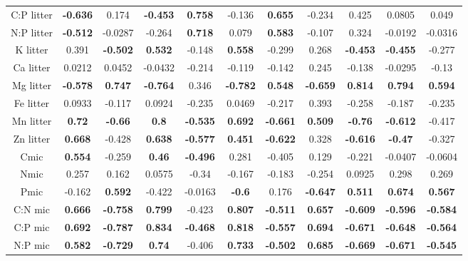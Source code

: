\documentclass[authoryear,preprint,review,12pt]{elsarticle}
\begin{document}
\begin{table}[h!]
\begin{center}
{\begin{tabular}{ccccccccccc}
  C:P litter & \textbf{ -0.636 } & 0.174 & \textbf{ -0.453 } & \textbf{ 0.758 } & -0.136 & \textbf{ 0.655 } & -0.234 & 0.425 & 0.0805 & 0.049 \\ 
  N:P litter & \textbf{ -0.512 } & -0.0287 & -0.264 & \textbf{ 0.718 } & 0.079 & \textbf{ 0.583 } & -0.107 & 0.324 & -0.0192 & -0.0316 \\ 
  K litter & 0.391 & \textbf{ -0.502 } & \textbf{ 0.532 } & -0.148 & \textbf{ 0.558 } & -0.299 & 0.268 & \textbf{ -0.453 } & \textbf{ -0.455 } & -0.277 \\ 
  Ca litter & 0.0212 & 0.0452 & -0.0432 & -0.214 & -0.119 & -0.142 & 0.245 & -0.138 & -0.0295 & -0.13 \\ 
  Mg litter & \textbf{ -0.578 } & \textbf{ 0.747 } & \textbf{ -0.764 } & 0.346 & \textbf{ -0.782 } & \textbf{ 0.548 } & \textbf{ -0.659 } & \textbf{ 0.814 } & \textbf{ 0.794 } & \textbf{ 0.594 } \\ 
  Fe litter & 0.0933 & -0.117 & 0.0924 & -0.235 & 0.0469 & -0.217 & 0.393 & -0.258 & -0.187 & -0.235 \\ 
  Mn litter & \textbf{ 0.72 } & \textbf{ -0.66 } & \textbf{  0.8 } & \textbf{ -0.535 } & \textbf{ 0.692 } & \textbf{ -0.661 } & \textbf{ 0.509 } & \textbf{ -0.76 } & \textbf{ -0.612 } & -0.417 \\ 
  Zn litter & \textbf{ 0.668 } & -0.428 & \textbf{ 0.638 } & \textbf{ -0.577 } & \textbf{ 0.451 } & \textbf{ -0.622 } & 0.328 & \textbf{ -0.616 } & \textbf{ -0.47 } & -0.327 \\ 
  Cmic & \textbf{ 0.554 } & -0.259 & \textbf{ 0.46 } & \textbf{ -0.496 } & 0.281 & -0.405 & 0.129 & -0.221 & -0.0407 & -0.0604 \\ 
  Nmic & 0.257 & 0.162 & 0.0575 & -0.34 & -0.167 & -0.183 & -0.254 & 0.0925 & 0.298 & 0.269 \\ 
  Pmic & -0.162 & \textbf{ 0.592 } & -0.422 & -0.0163 & \textbf{ -0.6 } & 0.176 & \textbf{ -0.647 } & \textbf{ 0.511 } & \textbf{ 0.674 } & \textbf{ 0.567 } \\ 
  C:N mic & \textbf{ 0.666 } & \textbf{ -0.758 } & \textbf{ 0.799 } & -0.423 & \textbf{ 0.807 } & \textbf{ -0.511 } & \textbf{ 0.657 } & \textbf{ -0.609 } & \textbf{ -0.596 } & \textbf{ -0.584 } \\ 
  C:P mic & \textbf{ 0.692 } & \textbf{ -0.787 } & \textbf{ 0.834 } & \textbf{ -0.468 } & \textbf{ 0.818 } & \textbf{ -0.557 } & \textbf{ 0.694 } & \textbf{ -0.671 } & \textbf{ -0.648 } & \textbf{ -0.564 } \\ 
  N:P mic & \textbf{ 0.582 } & \textbf{ -0.729 } & \textbf{ 0.74 } & -0.406 & \textbf{ 0.733 } & \textbf{ -0.502 } & \textbf{ 0.685 } & \textbf{ -0.669 } & \textbf{ -0.671 } & \textbf{ -0.545 } \\ 

\end{tabular}}
\end{center}
\end{table}
\end{document}
